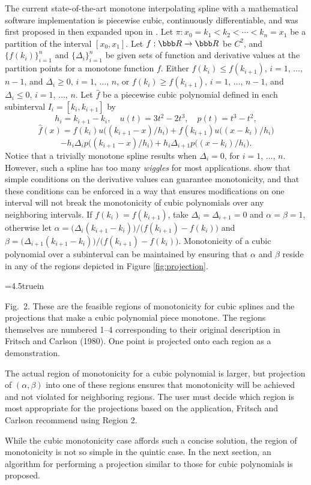 
The current state-of-the-art monotone interpolating spline with a
mathematical software implementation is piecewise cubic, continuously
differentiable, and was first proposed in \cite{fritsch1980monotone}
then expanded upon in \cite{carlson1985monotone}. Let $\pi: x_0 = k_1
< k_2 < \cdots < k_n = x_1$ be a partition of the interval
$[x_0,x_1]$. Let $f: {\bbb R} \rightarrow {\bbb R}$ be $C^2$, and
$\bigl\{f(k_i)\bigr\}_{i=1}^n$ and $\bigl\{\Delta_i\bigr\}_{i=1}^n$ be
given sets of function and derivative values at the partition points
for a monotone function $f$. Either $f(k_i) \leq f(k_{i+1})$, $i=1$,
$\ldots$, $n-1$, and $\Delta_i\ge0$, $i=1$, $\ldots$, $n$, or $f(k_i)
\geq f(k_{i+1})$, $i=1$, $\ldots$, $n-1$, and $\Delta_i\le0$, $i=1$,
$\ldots$, $n$. Let $\hat f$ be a piecewise cubic polynomial defined in
each subinterval $I_i = [k_i, k_{i+1}]$ by
$$ h_i = k_{i+1} - k_{i}, \quad u(t) = 3t^2 - 2t^3, \quad p(t) = t^3 - t^2,$$
$$\hat f(x) = f(k_i) u\big((k_{i+1} - x) / h_i\big) + f(k_{i+1}) u\big((x - k_i) / h_i\big) $$
$$ - h_i\Delta_i p\big((k_{i+1}-x)/h_i\big) + h_i\Delta_{i+1} p\big((x-k_i)/h_i\big).$$ 
Notice that a trivially monotone spline results when $\Delta_i = 0$,
for $i = 1$, $\ldots$, $n$. However, such a spline has too many
{\it wiggles} for most applications. \cite{carlson1985monotone}
show that simple conditions on the derivative values can guarantee
monotonicity, and that these conditions can be enforced in a way that
ensures modifications on one interval will not break the monotonicity
of cubic polynomials over any neighboring intervals. If $f(k_i) =
f(k_{i+1})$, take $\Delta_i = \Delta_{i+1} =0$ and $\alpha =\beta =1$,
otherwise let $\alpha = \big(\Delta_i (k_{i+1}-k_i)\big) /
\big(f(k_{i+1}) - f(k_i)\big)$ and $\beta =
\big(\Delta_{i+1}(k_{i+1}-k_i)\big) / \big(f(k_{i+1}) -
f(k_i)\big)$. Monotonicity of a cubic polynomial over a subinterval
can be maintained by ensuring that $\alpha$ and $\beta$ reside in any
of the regions depicted in Figure \ref{fig:projection}.

\topinsert
\centerline{\epsfxsize=4.5truein }
{\narrower\noindent\rmVIII Fig.\ 2.
These are the feasible regions of monotonicity for cubic splines and
the projections that make a cubic polynomial piece monotone. The
regions themselves are numbered 1--4 corresponding to their original
description in Fritsch and Carlson (1980). One point is projected onto
each region as a demonstration.
\par}
\endinsert

The actual region of monotonicity for a cubic polynomial is larger,
but projection of $(\alpha, \beta)$ into one of these regions ensures
that monotonicity will be achieved and not violated for neighboring
regions. The user must decide which region is most appropriate for the
projections based on the application, Fritsch and Carlson recommend
using Region 2.

While the cubic monotonicity case affords such a concise solution, the
region of monotonicity is not so simple in the quintic case. In the
next section, an algorithm for performing a projection similar to
those for cubic polynomials is proposed.
